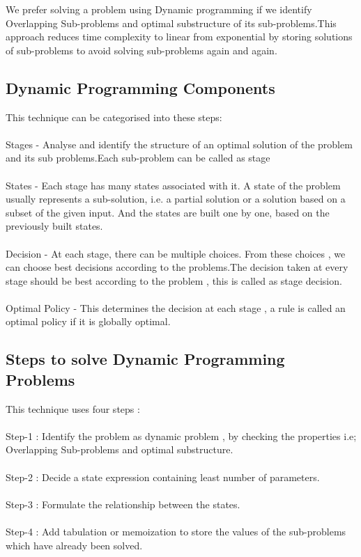 \documentclass[conference]{IEEEtran}
\begin{document}
We prefer solving a problem using Dynamic programming if we identify Overlapping Sub-problems and optimal substructure of its sub-problems.This approach reduces time complexity to linear from exponential by storing solutions of sub-problems to avoid solving sub-problems again and again.

\subsection{Dynamic Programming Components}
This technique can be categorised into these steps:\\\\
Stages - Analyse and identify the structure of an optimal solution of the problem and its sub problems.Each sub-problem can be called as stage\\\\
States - Each stage has many states associated with it. A state of the problem usually represents a sub-solution, i.e. a partial solution or a solution based on a subset of the given input. And the states are built one by one, based on the previously built states.\\\\
Decision - At each stage, there can be multiple choices. From these choices , we can choose best decisions according to the problems.The decision taken at every stage should be best according to the problem , this is called as stage decision.\\\\
Optimal Policy -  This determines the decision at each stage , a rule is called an optimal policy if it is globally optimal.

\subsection{Steps to solve Dynamic Programming Problems}
This technique uses four steps :\\\\
Step-1 : Identify the problem as dynamic problem , by checking the properties i.e; Overlapping Sub-problems and optimal substructure.\\\\
Step-2 : Decide a state expression containing least number of parameters.\\\\
Step-3 : Formulate the relationship between the states.\\\\
Step-4 : Add tabulation or memoization to store the values of the sub-problems which have already been solved.
\end{document}
